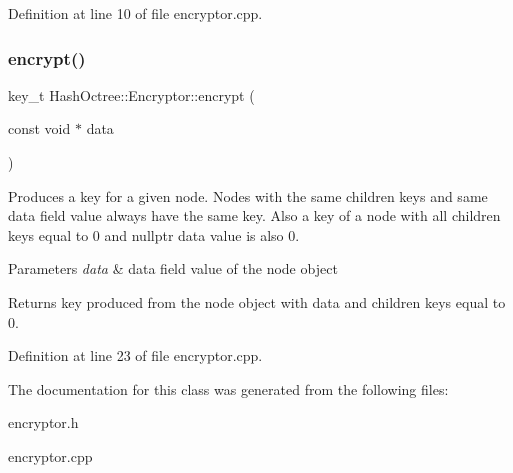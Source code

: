 Definition at line 10 of file encryptor.\+cpp.

\mbox{\label{class_hash_octree_1_1_encryptor_a96ce6d479c6b28f1f61c99989aa7a976_a96ce6d479c6b28f1f61c99989aa7a976}} 
\subsubsection{\texorpdfstring{encrypt()}{encrypt()}\hspace{0.1cm}{\footnotesize\ttfamily [3/3]}}
{\footnotesize\ttfamily key\+\_\+t Hash\+Octree\+::\+Encryptor\+::encrypt (\begin{DoxyParamCaption}\item[{const void $\ast$}]{data }\end{DoxyParamCaption})\hspace{0.3cm}{\ttfamily [static]}}

Produces a key for a given node. Nodes with the same children keys and same data field value always have the same key. Also a key of a node with all children keys equal to 0 and nullptr data value is also 0. 
\begin{DoxyParams}{Parameters}
{\em data} & data field value of the node object \\
\hline
\end{DoxyParams}
\begin{DoxyReturn}{Returns}
key produced from the node object with {\ttfamily data} and children keys equal to 0. 
\end{DoxyReturn}


Definition at line 23 of file encryptor.\+cpp.



The documentation for this class was generated from the following files\+:\begin{DoxyCompactItemize}
\item 
encryptor.\+h\item 
encryptor.\+cpp\end{DoxyCompactItemize}
